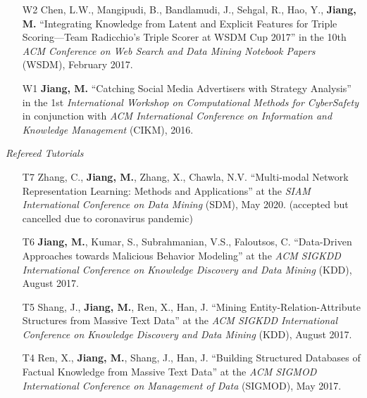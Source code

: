 \documentclass[10pt]{article}
\newenvironment{myindentpar}[1]%
{\begin{list}{}%
         {\setlength{\leftmargin}{#1}}%
         \item[]%
}
{\end{list}}
\newcounter{list}
\newcommand{\hide}[1]{}
\begin{document}
\begin{myindentpar}{0.00cm}
\begin{enumerate}[leftmargin=.5cm]
\item[W2] Chen, L.W., Mangipudi, B., Bandlamudi, J., Sehgal, R., Hao, Y., \textbf{Jiang, M.} ``Integrating Knowledge from Latent and Explicit Features for Triple Scoring—Team Radicchio's Triple Scorer at WSDM Cup 2017'' in the 10th \textit{ACM Conference on Web Search and Data Mining Notebook Papers} (WSDM), February 2017.

	\hide{\vspace{-0.1cm}\hspace{0.5cm}{\small \emph{I joined the discussion and edited the paper.}}}

\item[W1] \textbf{Jiang, M.} ``Catching Social Media Advertisers with Strategy Analysis'' in the 1st \textit{International Workshop on Computational Methods for CyberSafety} in conjunction with \textit{ACM International Conference on Information and Knowledge Management} (CIKM), 2016.

\end{enumerate}

\hspace{-0.25cm}\emph{Refereed Tutorials}

\begin{enumerate}[leftmargin=.5cm]

\item[T7] Zhang, C., \textbf{Jiang, M.}, Zhang, X., Chawla, N.V. ``Multi-modal Network Representation Learning: Methods and Applications'' at the \textit{SIAM International Conference on Data Mining} (SDM), May 2020. (accepted but cancelled due to coronavirus pandemic)

\item[T6] \textbf{Jiang, M.}, Kumar, S., Subrahmanian, V.S., Faloutsos, C. ``Data-Driven Approaches towards Malicious Behavior Modeling'' at the \textit{ACM SIGKDD International Conference on Knowledge Discovery and Data Mining} (KDD), August 2017.

\item[T5] Shang, J., \textbf{Jiang, M.}, Ren, X., Han, J. ``Mining Entity-Relation-Attribute Structures from Massive Text Data'' at the \textit{ACM SIGKDD International Conference on Knowledge Discovery and Data Mining} (KDD), August 2017.

\item[T4] Ren, X., \textbf{Jiang, M.}, Shang, J., Han, J. ``Building Structured Databases of Factual Knowledge from Massive Text Data'' at the \textit{ACM SIGMOD International Conference on Management of Data} (SIGMOD), May 2017.
		

\end{enumerate}
\end{myindentpar}
\end{document}
